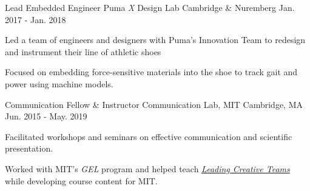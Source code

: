 \begin{cventries}
 \cventry
    {Lead Embedded Engineer} %
    {Puma \textit{X} Design Lab} %
    {Cambridge \& Nuremberg} %
    {Jan. 2017 - Jan. 2018} %
    {
      \begin{cvitems} %
        \item {Led a team of engineers and designers with Puma's Innovation Team to redesign and instrument their line of athletic shoes}
        \item {Focused on embedding force-sensitive materials into the shoe to track gait and power using machine models.}
      \end{cvitems}
    }

  \cventry
    {Communication Fellow \& Instructor} %
    {Communication Lab, MIT} %
    {Cambridge, MA} %
    {Jun. 2015 - May. 2019} %
    {
      \begin{cvitems} %
        \item {Facilitated workshops and seminars on effective communication and scientific presentation.}
        \item {Worked with MIT's \textit{GEL} program and helped teach \href{Leading Creative Teams}{\textit{Leading Creative Teams}} while developing course content for MIT.}
      \end{cvitems}
    }
\end{cventries}
